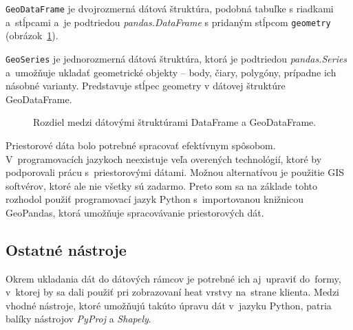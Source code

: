 \texttt{GeoDataFrame} je dvojrozmerná dátová štruktúra, podobná tabuľke s riadkami a~stĺpcami a~je podtriedou \emph{pandas.DataFrame} s pridaným stĺpcom \texttt{geometry} (obrázok~\ref{fig:dataframes}).

\texttt{GeoSeries} je jednorozmerná dátová štruktúra, ktorá je podtriedou \emph{pandas.Series} a~umožňuje ukladať geometrické objekty \--- body, čiary, polygóny, prípadne ich násobné varianty. Predstavuje stĺpec geometry v dátovej štruktúre GeoDataFrame.

\begin{figure}[ht]
    \centering
    \qquad
    \caption{Rozdiel medzi dátovými štruktúrami DataFrame a GeoDataFrame.}
    \label{fig:dataframes}
\end{figure}

Priestorové dáta bolo potrebné spracovať efektívnym spôsobom. V~programovacích jazykoch neexistuje veľa overených technológií, ktoré by podporovali prácu s~priestorovými dátami. Možnou alternatívou je použitie GIS softvérov, ktoré ale nie všetky sú zadarmo. Preto som sa na základe tohto rozhodol použiť programovací jazyk Python s~importovanou knižnicou GeoPandas, ktorá umožňuje spracovávanie priestorových dát.

\subsection*{Ostatné nástroje}
Okrem ukladania dát do dátových rámcov je potrebné ich aj~upraviť do~formy, v~ktorej by sa dali použiť pri zobrazovaní heat vrstvy na~strane klienta. Medzi vhodné nástroje, ktoré umožňujú takúto úpravu dát v~jazyku Python, patria balíky nástrojov \emph{PyProj} a \emph{Shapely}.

